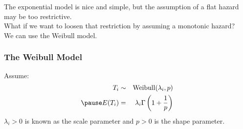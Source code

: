 \documentclass[handout]{beamer}
\begin{document}
\begin{frame}
\normalsize
The exponential model is nice and simple, but the assumption of a flat
hazard may be too restrictive.\\
\pause
\bigskip
What if we want to loosen that restriction by assuming a monotonic hazard?\\
\pause
\bigskip
We can use the Weibull model.
\end{frame}

\begin{frame}
\frametitle{The Weibull Model}
Assume:
\begin{eqnarray*}
T_i &\sim& \mathrm{Weibull}(\lambda_i, p)\\
\pause
E(T_i) &=& \lambda_i \Gamma \left( 1 + \frac{1}{p} \right)
\end{eqnarray*}
\pause
$\lambda_i > 0$ is known as the scale parameter and $p > 0$ is the shape parameter.
\pause
\begin{figure}
\begin{center}
\end{center}
\end{figure}
\end{frame}
\end{document}
